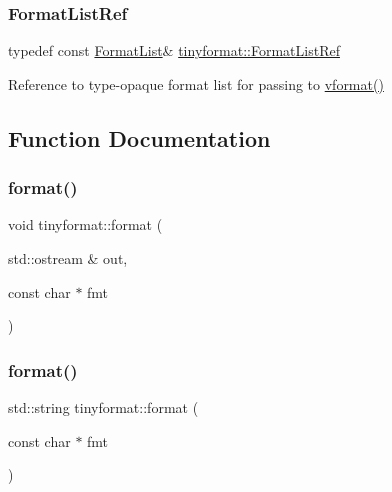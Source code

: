 \subsubsection{\texorpdfstring{Format\+List\+Ref}{FormatListRef}}
{\footnotesize\ttfamily typedef const \mbox{\hyperlink{classtinyformat_1_1_format_list}{Format\+List}}\& \mbox{\hyperlink{namespacetinyformat_ac2ce88095d287d22004006ed25117e0e}{tinyformat\+::\+Format\+List\+Ref}}}



Reference to type-\/opaque format list for passing to \mbox{\hyperlink{namespacetinyformat_a86ed74eb3ed66a662e96220d877da964}{vformat()}} 



\subsection{Function Documentation}
\mbox{\label{namespacetinyformat_adc3e74768f0e2204f9f9a726fc07ec61}} 
\subsubsection{\texorpdfstring{format()}{format()}\hspace{0.1cm}{\footnotesize\ttfamily [1/3]}}
{\footnotesize\ttfamily void tinyformat\+::format (\begin{DoxyParamCaption}\item[{std\+::ostream \&}]{out,  }\item[{const char $\ast$}]{fmt }\end{DoxyParamCaption})\hspace{0.3cm}{\ttfamily [inline]}}

\mbox{\label{namespacetinyformat_ae1b86cf888437f4c64856a1da1f7447b}} 
\subsubsection{\texorpdfstring{format()}{format()}\hspace{0.1cm}{\footnotesize\ttfamily [2/3]}}
{\footnotesize\ttfamily std\+::string tinyformat\+::format (\begin{DoxyParamCaption}\item[{const char $\ast$}]{fmt }\end{DoxyParamCaption})\hspace{0.3cm}{\ttfamily [inline]}}


